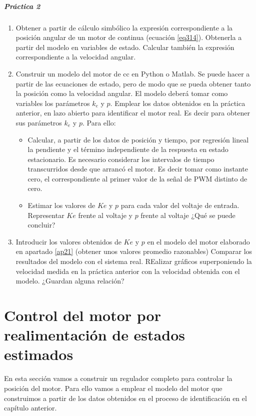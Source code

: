 \documentclass[10pt,a4paper]{report}
\begin{document}
\paragraph{Práctica 2}
\begin{enumerate}
\item Obtener a partir de cálculo simbólico la expresión correspondiente a la posición angular de un motor de continua (ecuación \ref{eq314}). Obtenerla a partir del modelo en variables de estado. Calcular también la expresión correspondiente a la velocidad angular.
\item \label{ap21} Construir un modelo del motor de cc en Python o Matlab. Se puede hacer a partir de las ecuaciones de estado, pero de modo que se pueda obtener tanto la posición como la velocidad angular. El modelo deberá tomar como variables los parámetros $k_e$ y $p$.
Emplear los datos obtenidos en la  práctica anterior, en lazo abierto para identificar el motor real. Es decir para obtener sus parámetros $k_e$ y $p$. Para ello:
\begin{itemize}
\item Calcular, a partir de los datos de posición y tiempo, por regresión lineal la pendiente y el término independiente de la respuesta en estado estacionario. Es necesario considerar los intervalos de tiempo transcurridos desde que arrancó el motor. Es decir tomar como instante cero, el correspondiente al primer valor de la señal de PWM distinto de cero.
\item Estimar los valores de $Ke$ y $p$ para cada valor del voltaje de entrada. Representar  $Ke$ frente al voltaje y $p$ frente al voltaje ¿Qué se puede concluir?
\end{itemize} 
\item Introducir los valores obtenidos de $Ke$ y $p$ en el modelo del motor elaborado en apartado \ref{ap21} (obtener unos valores promedio razonables) Comparar los resultados del modelo con el sistema real. REalizar gráficos superponiendo la velocidad medida en la práctica anterior con la velocidad obtenida con el modelo. ¿Guardan alguna relación?
\end{enumerate}

\chapter{Control del motor por realimentación de estados estimados}
En esta sección vamos a construir un regulador completo para controlar la posición del motor. Para ello vamos a emplear el modelo del motor que construimos a partir de los datos obtenidos en el proceso de identificación en el capítulo anterior.
\end{document}
